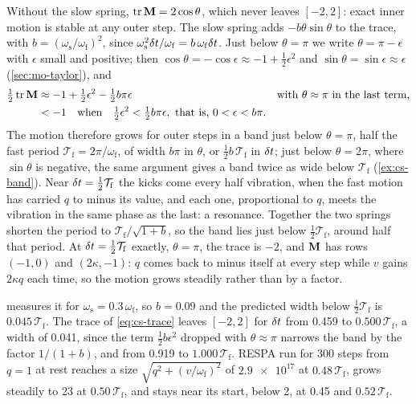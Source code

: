 Without the slow spring, $\operatorname{tr}\bm{\mathrm{M}} = 2\cos\theta$, which
never leaves $[-2, 2]$: exact inner motion is stable at any outer step.
The slow spring adds $-b\theta\sin\theta$ to the trace, with $b =
(\omega_{\mathrm s}/\omega_{\mathrm f})^2$, since $\omega_{\mathrm s}^2
\delta t/\omega_{\mathrm f} = b\,\omega_{\mathrm f}\delta t$. Just below
$\theta = \pi$ we write $\theta = \pi - \epsilon$ with $\epsilon$ small and
positive; then $\cos\theta = -\cos\epsilon \approx -1 + \frac12\epsilon^2$
and $\sin\theta = \sin\epsilon \approx \epsilon$ (\cref{sec:mo-taylor}),
and
\begin{align*}
   \tfrac12\operatorname{tr}\bm{\mathrm{M}} &\approx -1 + \tfrac12\epsilon^2
   - \tfrac12b\pi\epsilon && \text{with $\theta \approx \pi$ in the last
   term,}\\
   &< -1 \quad\text{when}\quad \tfrac12\epsilon^2 < \tfrac12b\pi\epsilon ,
   \text{ that is, } 0 < \epsilon < b\pi .
\end{align*}
The motion therefore grows for outer steps in a band just below $\theta =
\pi$, half the fast period $\mathcal{T}_{\mathrm f} = 2\pi/\omega_{\mathrm
f}$, of width $b\pi$ in $\theta$, or $\frac12b\,\mathcal{T}_{\mathrm f}$
in $\delta t$; just below $\theta = 2\pi$, where $\sin\theta$ is negative, the
same argument gives a band twice as wide below $\mathcal{T}_{\mathrm f}$
(\cref{ex:cs-band}). Near $\delta t = \frac12\mathcal{T}_{\mathrm f}$ the kicks
come every half vibration, when the fast motion has carried $q$ to minus
its value, and each one, proportional to $q$, meets the vibration in the
same phase as the last: a resonance. Together the two springs shorten the
period to $\mathcal{T}_{\mathrm f}/\sqrt{1 + b}$, so the band lies just
below $\frac12\mathcal{T}_{\mathrm f}$, around half that period. At
$\delta t = \frac12\mathcal{T}_{\mathrm f}$ exactly, $\theta = \pi$, the trace
is $-2$, and $\bm{\mathrm{M}}$ has rows $(-1, 0)$ and $(2\kappa, -1)$: $q$ comes
back to minus itself at every step while $v$ gains $2\kappa q$ each time,
so the motion grows steadily rather than by a factor.

 measures it for $\omega_{\mathrm s} =
0.3\,\omega_{\mathrm f}$, so $b = 0.09$ and the predicted width below
$\frac12\mathcal{T}_{\mathrm f}$ is $0.045\,\mathcal{T}_{\mathrm f}$. The
trace of \cref{eq:cs-trace} leaves $[-2, 2]$ for $\delta t$ from 0.459 to
$0.500\,\mathcal{T}_{\mathrm f}$, a width of 0.041, since the term
$\frac12b\epsilon^2$ dropped with $\theta \approx \pi$ narrows the band by
the factor $1/(1 + b)$, and from 0.919 to $1.000\,\mathcal{T}_{\mathrm
f}$. RESPA run for 300 steps from $q = 1$ at rest reaches a size
$\sqrt{q^2 + (v/\omega_{\mathrm f})^2}$ of $\num{2.9e17}$ at
$0.48\,\mathcal{T}_{\mathrm f}$, grows steadily to 23 at
$0.50\,\mathcal{T}_{\mathrm f}$, and stays near its start, below 2, at
0.45 and $0.52\,\mathcal{T}_{\mathrm f}$.

